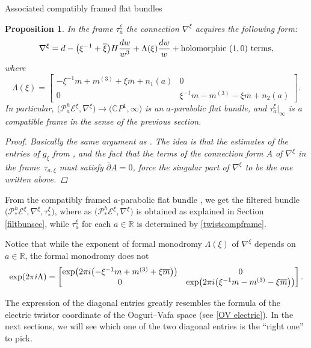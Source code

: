 \documentclass[11pt]{article}
\numberwithin{equation}{section}
\newtheorem{Proposition}[Theorem]{Proposition}
 { \theoremstyle{definition}
\newtheorem{Definition}[Theorem]{Definition}
\newtheorem{Notation}[Theorem]{Notation}
\newtheorem{Example}[Theorem]{Example}
\newtheorem{Remark}[Theorem]{Remark} }
\numberwithin{equation}{section}
\newcommand{\CP}{\mathbb{C}P^1}
\begin{document}
\begin{subsubsection}{Associated compatibly framed flat bundles}
\begin{Proposition} In the frame $\tau_a^{\xi}$ the connection $\nabla^{\xi}$ acquires the following form:
\begin{equation}\label{singform}
 \nabla^{\xi}={\rm d}-\bigl(\xi^{-1}+\overline{\xi}\bigr)H\frac{{\rm d}w}{w^3}+\Lambda(\xi)\frac{{\rm d}w}{w}+ \text{holomorphic $(1,0)$ terms},
\end{equation}
where
\begin{equation}\label{expformon}
 \Lambda(\xi)=\begin{bmatrix}-\xi^{-1}m +m^{(3)}+\xi \overline{m} +n_1(a) & 0\\
 0& \xi^{-1}m -m^{(3)}-\xi \overline{m} +n_2(a)
 \end{bmatrix}.
\end{equation}
In particular, $\bigl(\mathcal{P}^h_a\mathcal{E}^{\xi},\nabla^{\xi}\bigr)\to \bigl(\CP,\infty\bigr)$ is an $a$-parabolic flat bundle, and $\tau_a^{\xi}|_{\infty}$ is a compatible frame in the sense of the previous section.

\begin{proof}
Basically the same argument as \cite[Sections 7 and 8]{BB04}. The idea is that the estimates of the entries of $g_{\xi}$ from \cite{BB04}, and the fact that the terms of the connection form $A$ of $\nabla^{\xi}$ in the frame~$\tau_{a,\xi}$ must satisfy $\overline{\partial}A=0$, force the singular part of $\nabla^{\xi}$ to be the one written above.
\end{proof}

\end{Proposition}
From the compatibly framed $a$-parabolic flat bundle , we get the filtered bundle~${\bigl(\mathcal{P}^h_*\mathcal{E}^{\xi},\nabla^{\xi},\tau_{*}^{\xi}\bigr)}$, where as $\bigl(\mathcal{P}^h_*\mathcal{E}^{\xi},\nabla^{\xi}\bigr)$ is obtained as explained in Section \ref{filtbunsec}, while $\tau_a^{\xi}$ for each $a\in \mathbb{R}$ is determined by \eqref{twistcompframe}.

Notice that while the exponent of formal monodromy $\Lambda(\xi)$ of $\nabla^{\xi}$ depends on $a\in \mathbb{R}$, the formal monodromy does not
\begin{equation*}
 \exp (2\pi {\rm i} \Lambda)=\begin{bmatrix} \exp \bigl(2 \pi {\rm i}\bigl(-\xi^{-1}m +m^{(3)}+\xi \overline{m}\bigr)\bigr) & 0\\
 0 & \exp \bigl(2\pi {\rm i}\bigl(\xi^{-1}m -m^{(3)}-\xi \overline{m}\bigr)\bigr)\\
 \end{bmatrix}.
\end{equation*}

The expression of the diagonal entries greatly resembles the formula of the electric twistor coordinate of the Ooguri--Vafa space (see \eqref{OV electric}). In the next sections, we will see which one of the two diagonal entries is the ``right one'' to pick.
\end{subsubsection}
\end{document}
